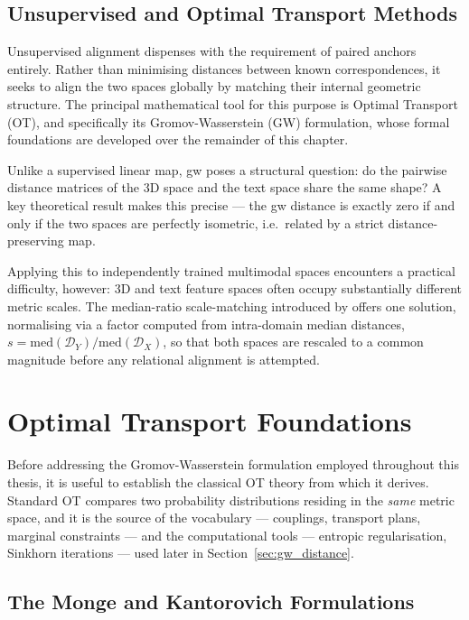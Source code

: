 \subsection{Unsupervised and Optimal Transport Methods}
\label{subsec:unsupervised_alignment}

Unsupervised alignment dispenses with the requirement of paired anchors entirely. Rather than minimising distances between known correspondences, it seeks to align the two spaces globally by matching their internal geometric structure. The principal mathematical tool for this purpose is Optimal Transport (OT), and specifically its Gromov-Wasserstein (GW) formulation, whose formal foundations are developed over the remainder of this chapter.

Unlike a supervised linear map, \gls{gw} poses a structural question: do the pairwise distance matrices of the 3D space and the text space share the same shape? A key theoretical result makes this precise --- the \gls{gw} distance is exactly zero if and only if the two spaces are perfectly isometric, i.e.\ related by a strict distance-preserving map.

Applying this to independently trained multimodal spaces encounters a practical difficulty, however: 3D and text feature spaces often occupy substantially different metric scales. The median-ratio scale-matching introduced by \textcite{li2026scale} offers one solution, normalising via a factor computed from intra-domain median distances, $s = \mathrm{med}(\mathcal{D}_Y) / \mathrm{med}(\mathcal{D}_X)$, so that both spaces are rescaled to a common magnitude before any relational alignment is attempted.

\section{Optimal Transport Foundations}
\label{sec:ot_foundations}

Before addressing the Gromov-Wasserstein formulation employed throughout this thesis, it is useful to establish the classical OT theory from which it derives. Standard OT compares two probability distributions residing in the \emph{same} metric space, and it is the source of the vocabulary --- couplings, transport plans, marginal constraints --- and the computational tools --- entropic regularisation, Sinkhorn iterations --- used later in Section~\ref{sec:gw_distance}.

\subsection{The Monge and Kantorovich Formulations}
\label{subsec:monge_kantorovich}

